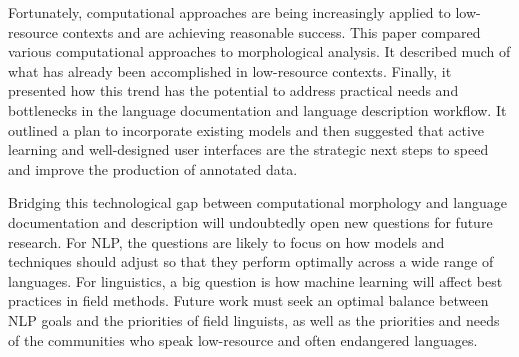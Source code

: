 \documentclass[12pt]{article}
\begin{document}
Fortunately, computational approaches are being increasingly applied to low-resource contexts and are achieving reasonable success. This paper compared various computational approaches to morphological analysis. It described much of what has already been accomplished in low-resource contexts. Finally, it presented how this trend has the potential to address practical needs and bottlenecks in the language documentation and language description workflow. It outlined a plan to incorporate existing models and then suggested that active learning and well-designed user interfaces are the strategic next steps to speed and improve the production of annotated data. 

Bridging this technological gap between computational morphology and language documentation and description will undoubtedly open new questions for future research. For NLP, the questions are likely to focus on how models and techniques should adjust so that they perform optimally across a wide range of languages. For linguistics, a big question is how machine learning will affect best practices in field methods. Future work must seek an optimal balance between NLP goals and the priorities of field linguists, as well as the priorities and needs of the communities who speak low-resource and often endangered languages. 

\pagebreak



\end{document}
